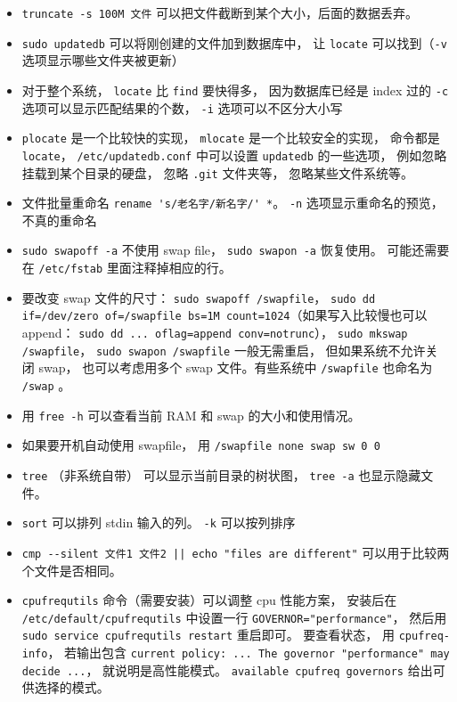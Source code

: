 \begin{itemize}
\item \verb|truncate -s 100M 文件| 可以把文件截断到某个大小，后面的数据丢弃。
\item \verb`sudo updatedb` 可以将刚创建的文件加到数据库中， 让 \verb`locate` 可以找到（\verb|-v| 选项显示哪些文件夹被更新）
\item 对于整个系统， \verb`locate` 比 \verb`find` 要快得多， 因为数据库已经是 index 过的 \verb`-c` 选项可以显示匹配结果的个数， \verb`-i` 选项可以不区分大小写
\item \verb|plocate| 是一个比较快的实现， \verb|mlocate| 是一个比较安全的实现， 命令都是 \verb|locate|， \verb|/etc/updatedb.conf| 中可以设置 \verb|updatedb| 的一些选项， 例如忽略挂载到某个目录的硬盘， 忽略 \verb|.git| 文件夹等， 忽略某些文件系统等。
\item 文件批量重命名 \verb|rename 's/老名字/新名字/' *|。 \verb|-n| 选项显示重命名的预览， 不真的重命名
\item \verb|sudo swapoff -a| 不使用 swap file， \verb|sudo swapon -a| 恢复使用。 可能还需要在 \verb|/etc/fstab| 里面注释掉相应的行。
\item 要改变 swap 文件的尺寸： \verb|sudo swapoff /swapfile|， \verb|sudo dd if=/dev/zero of=/swapfile bs=1M count=1024|（如果写入比较慢也可以 append： \verb|sudo dd ... oflag=append conv=notrunc|）， \verb|sudo mkswap /swapfile|， \verb|sudo swapon /swapfile| 一般无需重启， 但如果系统不允许关闭 swap， 也可以考虑用多个 swap 文件。有些系统中 \verb|/swapfile| 也命名为 \verb|/swap| 。
\item 用 \verb|free -h| 可以查看当前 RAM 和 swap 的大小和使用情况。
\item 如果要开机自动使用 swapfile， 用 \verb|/swapfile none swap sw 0 0|
\item \verb|tree| （非系统自带） 可以显示当前目录的树状图， \verb|tree -a| 也显示隐藏文件。
\item \verb|sort| 可以排列 stdin 输入的列。 \verb|-k| 可以按列排序
\item \verb`cmp --silent 文件1 文件2 || echo "files are different"` 可以用于比较两个文件是否相同。
\item \verb|cpufrequtils| 命令（需要安装）可以调整 cpu 性能方案， 安装后在 \verb|/etc/default/cpufrequtils| 中设置一行 \verb|GOVERNOR="performance"|， 然后用 \verb|sudo service cpufrequtils restart| 重启即可。 要查看状态， 用 \verb|cpufreq-info|， 若输出包含 \verb|current policy: ... The governor "performance" may decide ...|， 就说明是高性能模式。 \verb|available cpufreq governors| 给出可供选择的模式。
\end{itemize}

